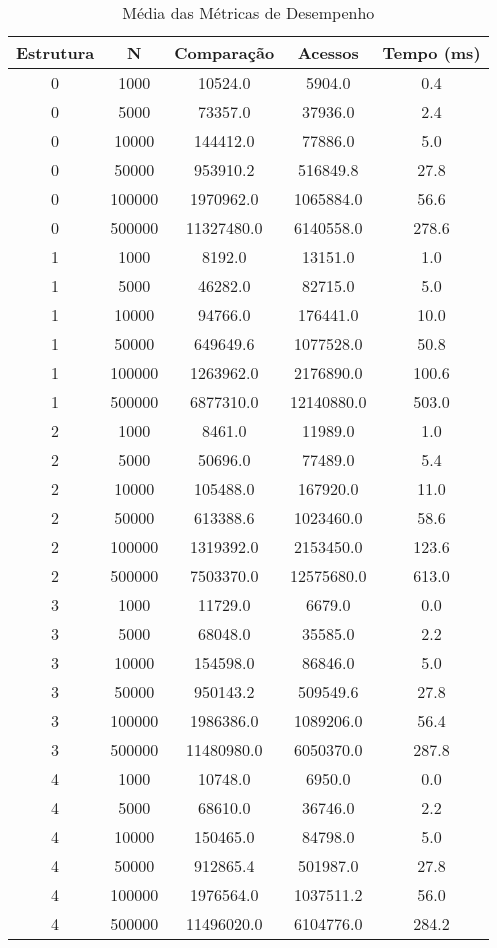 \begin{table}[htbp]
\caption{Média das Métricas de Desempenho}
\label{tab:table1}
\begin{tabular}{c|c|c|c|c}
\textbf{Estrutura} & \textbf{N} & \textbf{Comparação} & \textbf{Acessos} & \textbf{Tempo (ms)}\\
\hline
0 & 1000 & 10524.0 & 5904.0 & 0.4\\
0 & 5000 & 73357.0 & 37936.0 & 2.4\\
0 & 10000 & 144412.0 & 77886.0 & 5.0\\
0 & 50000 & 953910.2 & 516849.8 & 27.8\\
0 & 100000 & 1970962.0 & 1065884.0 & 56.6\\
0 & 500000 & 11327480.0 & 6140558.0 & 278.6\\
1 & 1000 & 8192.0 & 13151.0 & 1.0\\
1 & 5000 & 46282.0 & 82715.0 & 5.0\\
1 & 10000 & 94766.0 & 176441.0 & 10.0\\
1 & 50000 & 649649.6 & 1077528.0 & 50.8\\
1 & 100000 & 1263962.0 & 2176890.0 & 100.6\\
1 & 500000 & 6877310.0 & 12140880.0 & 503.0\\
2 & 1000 & 8461.0 & 11989.0 & 1.0\\
2 & 5000 & 50696.0 & 77489.0 & 5.4\\
2 & 10000 & 105488.0 & 167920.0 & 11.0\\
2 & 50000 & 613388.6 & 1023460.0 & 58.6\\
2 & 100000 & 1319392.0 & 2153450.0 & 123.6\\
2 & 500000 & 7503370.0 & 12575680.0 & 613.0\\
3 & 1000 & 11729.0 & 6679.0 & 0.0\\
3 & 5000 & 68048.0 & 35585.0 & 2.2\\
3 & 10000 & 154598.0 & 86846.0 & 5.0\\
3 & 50000 & 950143.2 & 509549.6 & 27.8\\
3 & 100000 & 1986386.0 & 1089206.0 & 56.4\\
3 & 500000 & 11480980.0 & 6050370.0 & 287.8\\
4 & 1000 & 10748.0 & 6950.0 & 0.0\\
4 & 5000 & 68610.0 & 36746.0 & 2.2\\
4 & 10000 & 150465.0 & 84798.0 & 5.0\\
4 & 50000 & 912865.4 & 501987.0 & 27.8\\
4 & 100000 & 1976564.0 & 1037511.2 & 56.0\\
4 & 500000 & 11496020.0 & 6104776.0 & 284.2\\
\end{tabular}
\end{table}
